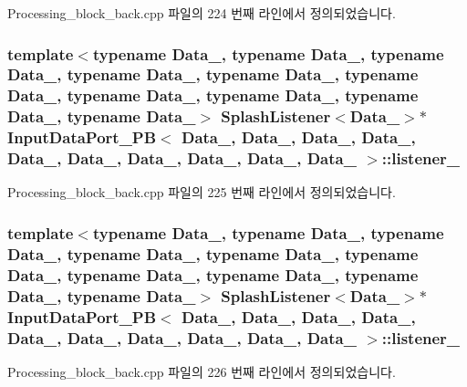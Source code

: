 Processing\+\_\+block\+\_\+back.\+cpp 파일의 224 번째 라인에서 정의되었습니다.

\subsubsection[{\texorpdfstring{listener\+\_\+2}{listener_2}}]{\setlength{\rightskip}{0pt plus 5cm}template$<$typename Data\+\_, typename Data\+\_, typename Data\+\_, typename Data\+\_, typename Data\+\_, typename Data\+\_, typename Data\+\_, typename Data\+\_, typename Data\+\_, typename Data\+\_$>$ {\bf Splash\+Listener}$<$Data\+\_$>$$\ast$ {\bf Input\+Data\+Port\+\_\+\+PB}$<$ Data\+\_, Data\+\_, Data\+\_, Data\+\_, Data\+\_, Data\+\_, Data\+\_, Data\+\_, Data\+\_, Data\+\_ $>$\+::listener\+\_}\hypertarget{classInputDataPort__PB_af24e1027929b9fd004b1498b54e6173c}{}\label{classInputDataPort__PB_af24e1027929b9fd004b1498b54e6173c}


Processing\+\_\+block\+\_\+back.\+cpp 파일의 225 번째 라인에서 정의되었습니다.

\subsubsection[{\texorpdfstring{listener\+\_\+3}{listener_3}}]{\setlength{\rightskip}{0pt plus 5cm}template$<$typename Data\+\_, typename Data\+\_, typename Data\+\_, typename Data\+\_, typename Data\+\_, typename Data\+\_, typename Data\+\_, typename Data\+\_, typename Data\+\_, typename Data\+\_$>$ {\bf Splash\+Listener}$<$Data\+\_$>$$\ast$ {\bf Input\+Data\+Port\+\_\+\+PB}$<$ Data\+\_, Data\+\_, Data\+\_, Data\+\_, Data\+\_, Data\+\_, Data\+\_, Data\+\_, Data\+\_, Data\+\_ $>$\+::listener\+\_}\hypertarget{classInputDataPort__PB_a3045eef4ff7effbb5a8fbfb7552dbb03}{}\label{classInputDataPort__PB_a3045eef4ff7effbb5a8fbfb7552dbb03}


Processing\+\_\+block\+\_\+back.\+cpp 파일의 226 번째 라인에서 정의되었습니다.

